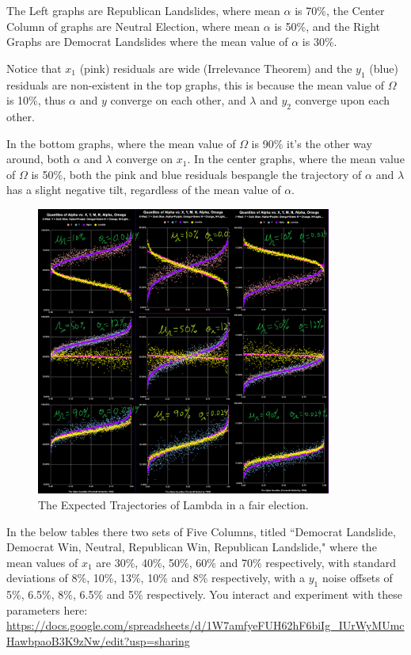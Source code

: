 The Left graphs are Republican Landslides, where mean $\alpha$ is 70\%, the Center Column of graphs are Neutral Election, where mean $\alpha$ is 50\%, and the Right Graphs are Democrat Landslides where the mean value of $\alpha$ is 30\%.

Notice that $x_{1}$ (pink) residuals are wide (Irrelevance Theorem) and the $y_{1}$ (blue) residuals are non-existent in the top graphs, this is because the mean value of $\Omega$ is 10\%, thus $\alpha$ and $y$ converge on each other, and $\lambda$ and $y_{2}$ converge upon each other.

In the bottom graphs, where the mean value of $\Omega$ is 90\% it's the other way around, both $\alpha$ and $\lambda$ converge on $x_{1}$. In the center graphs, where the mean value of $\Omega$ is 50\%, both the pink and blue residuals bespangle the trajectory of $\alpha$ and $\lambda$ has a slight negative tilt, regardless of the mean value of $\alpha$.
\begin{figure}[bp!]
\begin{center}
\caption{The Expected Trajectories of Lambda in a fair election.}
\includegraphics[width=275pt]{Fair Lambda.png}
\end{center}
\end{figure}
\newpage
In the below tables there two sets of Five Columns, titled ``Democrat Landslide, Democrat Win, Neutral, Republican Win, Republican Landslide," where the mean values of $x_{1}$ are 30\%, 40\%, 50\%, 60\% and 70\% respectively, with standard deviations of 8\%, 10\%, 13\%, 10\% and 8\% respectively, with a $y_{1}$ noise offsets of 5\%, 6.5\%, 8\%, 6.5\% and 5\% respectively. You interact and experiment with these parameters here: \url{https://docs.google.com/spreadsheets/d/1W7amfyeFUH62hF6biIg_IUrWyMUmcHawbpaoB3K9zNw/edit?usp=sharing}

